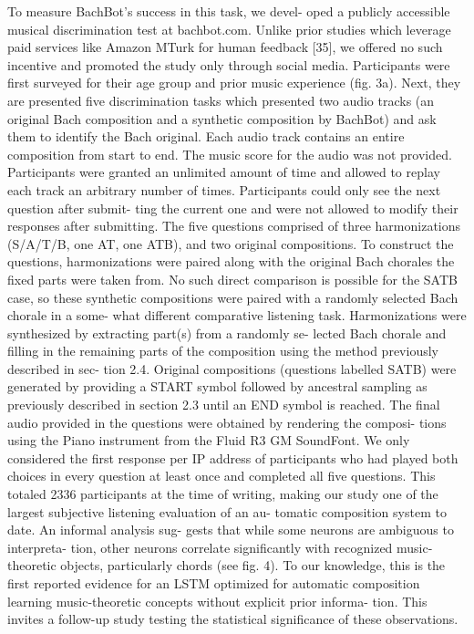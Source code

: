 \cite{Liang2017} 
To measure BachBot’s success in this task, we devel- oped a publicly accessible musical discrimination test at bachbot.com. Unlike prior studies which leverage paid services like Amazon MTurk for human feedback [35], we offered no such incentive and promoted the study only through social media. Participants were first surveyed for their age group and prior music experience (fig. 3a). Next, they are presented five discrimination tasks which presented two audio tracks (an original Bach composition and a synthetic composition by BachBot) and ask them to identify the Bach original. Each audio track contains an entire composition from start to end. The music score for the audio was not provided. Participants were granted an unlimited amount of time and allowed to replay each track an arbitrary number of times. Participants could only see the next question after submit- ting the current one and were not allowed to modify their responses after submitting. The five questions comprised of three harmonizations (S/A/T/B, one AT, one ATB), and two original compositions. To construct the questions, harmonizations were paired along with the original Bach chorales the fixed parts were taken from. No such direct comparison is possible for the SATB case, so these synthetic compositions were paired with a randomly selected Bach chorale in a some- what different comparative listening task. Harmonizations were synthesized by extracting part(s) from a randomly se- lected Bach chorale and filling in the remaining parts of the composition using the method previously described in sec- tion 2.4. Original compositions (questions labelled SATB) were generated by providing a START symbol followed by ancestral sampling as previously described in section 2.3 until an END symbol is reached. The final audio provided in the questions were obtained by rendering the composi- tions using the Piano instrument from the Fluid R3 GM SoundFont.
We only considered the first response per IP address of participants who had played both choices in every question at least once and completed all five questions. This totaled 2336 participants at the time of writing, making our study one of the largest subjective listening evaluation of an au- tomatic composition system to date.
An informal analysis sug- gests that while some neurons are ambiguous to interpreta- tion, other neurons correlate significantly with recognized music-theoretic objects, particularly chords (see fig. 4). To our knowledge, this is the first reported evidence for an LSTM optimized for automatic composition learning music-theoretic concepts without explicit prior informa- tion. This invites a follow-up study testing the statistical significance of these observations.

